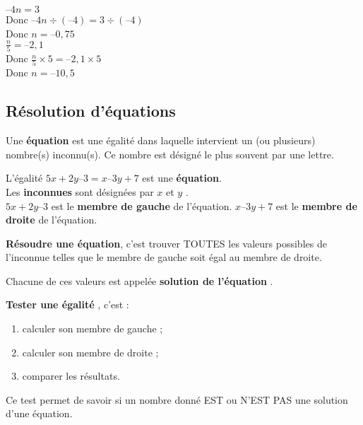 \documentclass[10pt]{article}
\begin{document}
{\begin{Ex}
\begin{multicols}{2}
$–4n=3$\\
Donc $–4n \div \left(–4\right)=3 \div \left(–4\right)$\\
Donc $n=–0,75$\\

$\frac{n}{5}=–2,1$\\
Donc $\frac{n}{5} \times 5=–2,1 \times 5$\\
Donc $n=–10,5$

\end{multicols}
\end{Ex}

\subsection{Résolution d'équations}

\begin{Df}
Une \textbf{équation} est une égalité dans laquelle intervient un (ou plusieurs)
nombre(s) inconnu(s). Ce nombre est désigné le plus souvent par une lettre.
\end{Df}


\begin{Ex}
L'égalité $5x + 2y – 3 = x – 3y + 7$ est une \textbf{équation}.\\
Les \textbf{inconnues} sont désignées par $x$ et $y$ .\\$5x + 2y – 3$ est le \textbf{membre de gauche} de l'équation.
$x – 3y + 7$ est le \textbf{membre de droite} de l'équation.
\end{Ex}
 		 
\begin{Df} \textbf{Résoudre une équation}, c'est trouver TOUTES les valeurs possibles de l'inconnue 
telles que le membre de gauche soit égal au membre de droite.
\end{Df}


\begin{Rq}
Chacune de ces valeurs est appelée \textbf{\og  solution de l'équation \fg{}}.
\end{Rq}

\begin{Df} \textbf{\og Tester une égalité \fg{}},
c'est :
\begin{enumerate}
\item 	calculer son membre de gauche ;
\item   calculer son membre de droite ;
\item   comparer les résultats.
\end{enumerate}
Ce test permet de savoir si un nombre donné EST ou N'EST PAS une solution d'une équation.
\end{Df}


}
\end{document}
